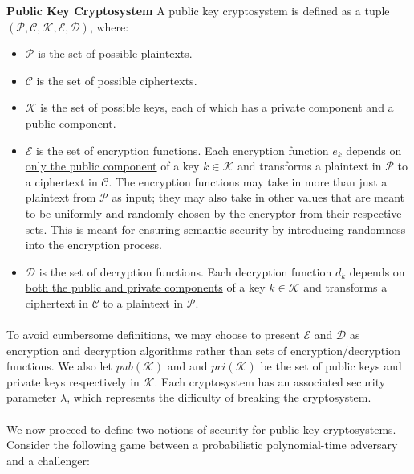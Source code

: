 \theoremstyle{definition}
\begin{definition}{\textbf{Public Key Cryptosystem}}
A public key cryptosystem is defined as a tuple $(\mathcal{P}, \mathcal{C}, \mathcal{K}, \mathcal{E}, \mathcal{D})$, where:
\begin{itemize}
    \item $\mathcal{P}$ is the set of possible plaintexts.
    \item $\mathcal{C}$ is the set of possible ciphertexts.
    \item $\mathcal{K}$ is the set of possible keys, each of which has a private component and a public component.
    \item $\mathcal{E}$ is the set of encryption functions. Each encryption function $e_k$ depends on \underline{only the public component} of a key $k \in \mathcal{K}$ and transforms a plaintext in $\mathcal{P}$ to a ciphertext in $\mathcal{C}$. The encryption functions may take in more than just a plaintext from $\mathcal{P}$ as input; they may also take in other values that are meant to be uniformly and randomly chosen by the encryptor from their respective sets. This is meant for ensuring semantic security by introducing randomness into the encryption process.
    \item $\mathcal{D}$ is the set of decryption functions. Each decryption function $d_k$ depends on \underline{both the public and private components} of a key $k \in \mathcal{K}$ and transforms a ciphertext in $\mathcal{C}$ to a plaintext in $\mathcal{P}$.
\end{itemize}
\end{definition}

\paragraph{}
To avoid cumbersome definitions, we may choose to present $\mathcal{E}$ and $\mathcal{D}$ as encryption and decryption algorithms rather than sets of encryption/decryption functions. We also let $pub(\mathcal{K})$ and and $pri(\mathcal{K})$ be the set of public keys and private keys respectively in $\mathcal{K}$. Each cryptosystem has an associated security parameter $\lambda$, which represents the difficulty of breaking the cryptosystem.

\paragraph{}
We now proceed to define two notions of security for public key cryptosystems. Consider the following game between a probabilistic polynomial-time adversary and a challenger:

